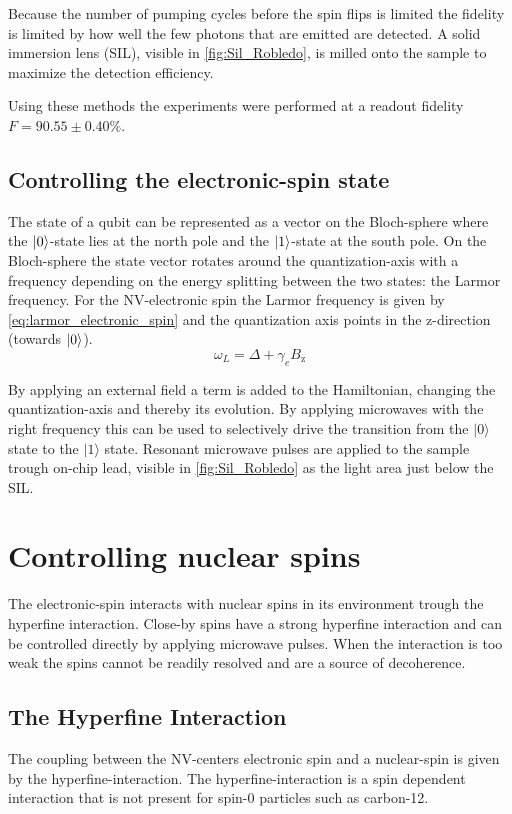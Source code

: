 Because the number of pumping cycles before the spin flips is limited the fidelity is limited by how well the few photons that are emitted are detected.
A solid immersion lens (SIL), visible in \cref{fig:Sil_Robledo}, is milled onto the sample to maximize the detection efficiency.

Using these methods the experiments were performed at a readout fidelity $F= 90.55 \pm 0.40 \%$.

\subsection{Controlling the electronic-spin state}
The state of a qubit can be represented as a vector on the Bloch-sphere where the ${\left\vert{0}\right\rangle}$-state lies at the north pole and the ${\left\vert{1}\right\rangle}$-state at the south pole.
On the Bloch-sphere the state vector rotates around the quantization-axis with a frequency depending on the energy splitting between the two states: the Larmor frequency.
For the NV-electronic spin the Larmor frequency is given by \cref{eq:larmor_electronic_spin} and the quantization axis points in the z-direction (towards ${\left\vert{0}\right\rangle}$).
\begin{equation}
    \omega_L =\Delta + \gamma_e {B_\mathrm{z}}
    \label{eq:larmor_electronic_spin}
\end{equation}

By applying an external field a term is added to the Hamiltonian, changing the quantization-axis and thereby its evolution.
By applying microwaves with the right frequency this can be used to selectively drive the transition from the  $|0\rangle$ state to the $|1\rangle$ state\citep{Jelezko2004Observation}.
Resonant microwave pulses are applied to the sample trough on-chip lead, visible in \cref{fig:Sil_Robledo} as the light area just below the SIL.

\section{Controlling nuclear spins}
The electronic-spin interacts with nuclear spins in its environment trough the hyperfine interaction.
Close-by spins have a strong hyperfine interaction and can be controlled directly by applying microwave pulses.
When the interaction is too weak the spins cannot be readily resolved and are a source of decoherence.

\subsection{The Hyperfine Interaction}
The coupling between the NV-centers electronic spin and a nuclear-spin is given by the hyperfine-interaction.
The hyperfine-interaction is a spin dependent interaction that is not present for spin-0 particles such as carbon-12.

